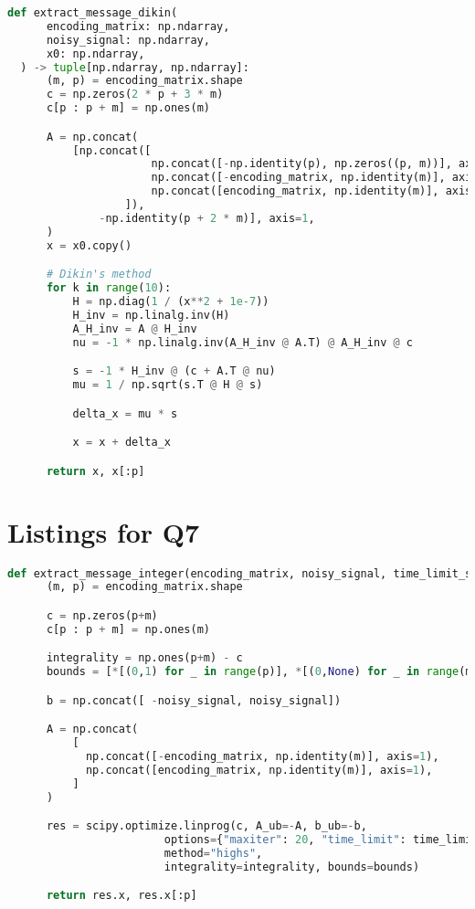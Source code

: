 \documentclass{article}
\begin{document}

\begin{lstlisting}[language=Python, caption={Message decryption based on Dikin's method. The output is tuple of solution of the problem, and decrypted message itself}, label={lst:dikin}]
  def extract_message_dikin(
      encoding_matrix: np.ndarray,
      noisy_signal: np.ndarray,
      x0: np.ndarray,
  ) -> tuple[np.ndarray, np.ndarray]:
      (m, p) = encoding_matrix.shape
      c = np.zeros(2 * p + 3 * m)
      c[p : p + m] = np.ones(m)

      A = np.concat(
          [np.concat([
                      np.concat([-np.identity(p), np.zeros((p, m))], axis=1),
                      np.concat([-encoding_matrix, np.identity(m)], axis=1),
                      np.concat([encoding_matrix, np.identity(m)], axis=1),
                  ]),
              -np.identity(p + 2 * m)], axis=1,
      )
      x = x0.copy()

      # Dikin's method
      for k in range(10):
          H = np.diag(1 / (x**2 + 1e-7))
          H_inv = np.linalg.inv(H)
          A_H_inv = A @ H_inv
          nu = -1 * np.linalg.inv(A_H_inv @ A.T) @ A_H_inv @ c

          s = -1 * H_inv @ (c + A.T @ nu)
          mu = 1 / np.sqrt(s.T @ H @ s)

          delta_x = mu * s

          x = x + delta_x

      return x, x[:p]
\end{lstlisting}

\newpage

\section{Listings for Q7}


\begin{lstlisting}[language=Python, caption={Message decryption based on solution of integer LOP in geometric form. The output is tuple of solution of the problem and decrypted message itself}, label={lst:int}]
  def extract_message_integer(encoding_matrix, noisy_signal, time_limit_s=120):
      (m, p) = encoding_matrix.shape

      c = np.zeros(p+m)
      c[p : p + m] = np.ones(m)

      integrality = np.ones(p+m) - c
      bounds = [*[(0,1) for _ in range(p)], *[(0,None) for _ in range(m)]]

      b = np.concat([ -noisy_signal, noisy_signal])

      A = np.concat(
          [
            np.concat([-encoding_matrix, np.identity(m)], axis=1),
            np.concat([encoding_matrix, np.identity(m)], axis=1),
          ]
      )

      res = scipy.optimize.linprog(c, A_ub=-A, b_ub=-b,
                        options={"maxiter": 20, "time_limit": time_limit_s},
                        method="highs",
                        integrality=integrality, bounds=bounds)

      return res.x, res.x[:p]
\end{lstlisting}
\end{document}
